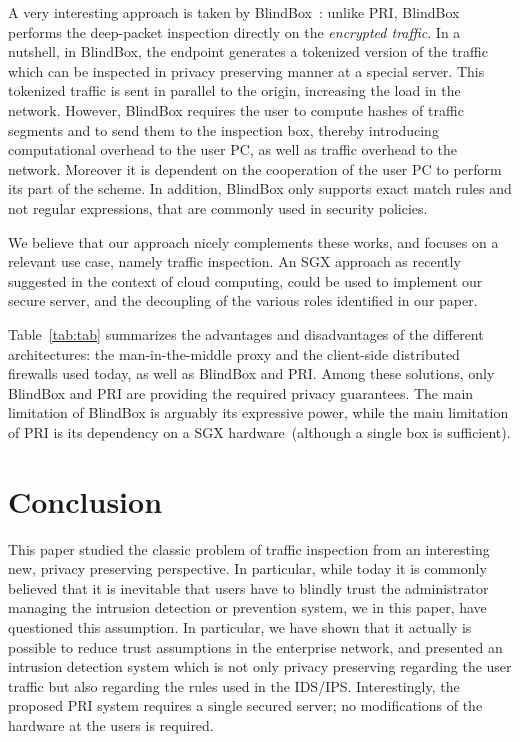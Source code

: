 \documentclass{sig-alternate-10pt}
\newcommand{\sys}{PRI\xspace}
\begin{document}
A very interesting approach is taken by BlindBox~\cite{blindbox}:
unlike \sys, BlindBox
performs the deep-packet inspection directly on the
\emph{encrypted traffic}. 
In a nutshell, in BlindBox, the endpoint generates a tokenized 
version of the traffic which can be inspected in privacy preserving 
manner at a special server. This tokenized traffic is sent in parallel to the 
origin, increasing the load in the network. 
However, BlindBox requires the user to compute hashes 
of traffic segments and to send them to the inspection box, 
thereby introducing computational overhead to the user PC, as well as 
traffic overhead to the network. Moreover it is dependent 
on the cooperation of the user PC to perform its part 
of the scheme. In addition, BlindBox only supports exact match rules and 
not regular expressions, that are commonly used in security policies.

We believe that our approach nicely
complements these works, and focuses
on a relevant use case, namely traffic inspection. 
An SGX approach
as recently suggested in the context of cloud computing,
could be used to implement our secure server,
and the decoupling of the various
roles identified in our paper.


Table~\ref{tab:tab} summarizes the advantages and disadvantages
of the different architectures: the man-in-the-middle proxy
and the client-side distributed firewalls used today, as well
as BlindBox and \sys. Among these solutions, only BlindBox
and \sys are providing the required privacy guarantees.
The main limitation of BlindBox is arguably its
expressive power, while the main limitation of \sys
is its dependency on a SGX hardware~(although a single box is sufficient).

\section{Conclusion}\label{sec:conclusion}

This paper studied the classic problem of traffic inspection from an
interesting new, 
privacy preserving perspective. In particular,
while today it is commonly believed that 
it is inevitable
that users have to blindly trust the administrator managing the intrusion detection
or prevention system, we in this paper, have questioned this assumption.
In particular, we have shown that
it actually is possible to reduce trust assumptions
in the enterprise network, and presented an intrusion detection
system which is not only privacy preserving regarding
the user traffic but also regarding the rules used
in the IDS/IPS. Interestingly, the proposed \sys
system requires a single secured server; no
modifications of the hardware at the users is required.
\end{document}
